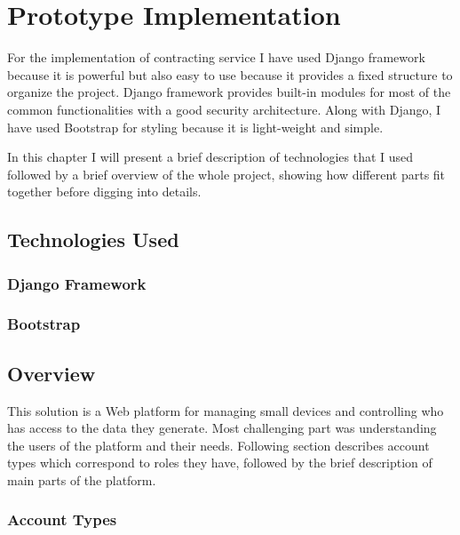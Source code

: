 \chapter{Prototype Implementation}

For the implementation of contracting service I have used Django framework because it is powerful but also easy to use because it provides a fixed structure to organize the project. Django framework provides built-in modules for most of the common functionalities with a good security architecture. Along with Django, I have used Bootstrap for styling because it is light-weight and simple.

In this chapter I will present a brief description of technologies that I used followed by a brief overview of the whole project, showing how different parts fit together before digging into details.

\section{Technologies Used}

\subsection{Django Framework}

\subsection{Bootstrap}

\section{Overview}

This solution is a Web platform for managing small devices and controlling who has access to the data they generate. Most challenging part was understanding the users of the platform and their needs. Following section describes account types which correspond to roles they have, followed by the brief description of main parts of the platform.

\subsection{Account Types}

